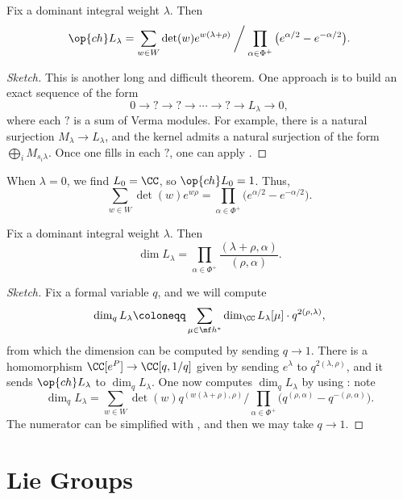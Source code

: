 \documentclass{article}
\begin{document}
\begin{theorem} \label{thm:weyl-character}
	Fix a dominant integral weight $\lambda$. Then
	\[\op{ch}L_\lambda=\sum_{w\in W}\det(w)e^{w(\lambda+\rho)}\mathbin{\bigg/}\prod_{\alpha\in\Phi^+}\big(e^{\alpha/2}-e^{-\alpha/2}\big).\]
\end{theorem}
\begin{proof}[Sketch]
	This is another long and difficult theorem. One approach is to build an exact sequence of the form
	\[0\to{?}\to{?}\to\cdots\to{?}\to L_\lambda\to0,\]
	where each $?$ is a sum of Verma modules. For example, there is a natural surjection $M_\lambda\to L_\lambda$, and the kernel admits a natural surjection of the form $\bigoplus_i M_{s_i\lambda}$. Once one fills in each $?$, one can apply .
\end{proof}
\begin{example} \label{ex:weyl-denom}
	When $\lambda=0$, we find $L_0=\CC$, so $\op{ch}L_0=1$. Thus,
	\[\sum_{w\in W}\det(w)e^{w\rho}=\prod_{\alpha\in\Phi^+}\big(e^{\alpha/2}-e^{-\alpha/2}\big).\]
\end{example}
\begin{corollary} \label{cor:weyl-dim}
	Fix a dominant integral weight $\lambda$. Then
	\[\dim L_\lambda=\prod_{\alpha\in\Phi^+}\frac{(\lambda+\rho,\alpha)}{(\rho,\alpha)}.\]
\end{corollary}
\begin{proof}[Sketch]
	Fix a formal variable $q$, and we will compute
	\[\dim_qL_\lambda\coloneqq\sum_{\mu\in\mf h^*}\dim_\CC L_\lambda[\mu]\cdot q^{2(\rho,\lambda)},\]
	from which the dimension can be computed by sending $q\to1$. There is a homomorphism $\CC[e^P]\to\CC[q,1/q]$ given by sending $e^\lambda$ to $q^{2(\lambda,\rho)}$, and it sends $\op{ch}L_\lambda$ to $\dim_qL_\lambda$. One now computes $\dim_qL_\lambda$ by using : note
	\[\dim_qL_\lambda=\sum_{w\in W}\det(w)q^{(w(\lambda+\rho),\rho)}\mathbin{\bigg/}\prod_{\alpha\in\Phi^+}\big(q^{(\rho,\alpha)}-q^{-(\rho,\alpha)}\big).\]
	The numerator can be simplified with , and then we may take $q\to1$.
\end{proof}

\newpage
\section{Lie Groups}
\end{document}
